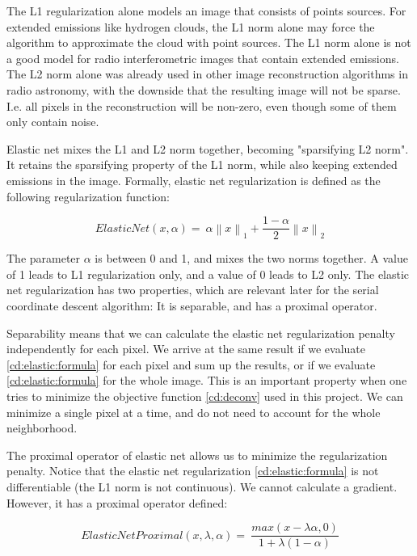 The L1 regularization alone models an image that consists of points sources. For extended emissions like hydrogen clouds, the L1 norm alone may force the algorithm to approximate the cloud with point sources. The L1 norm alone is not a good model for radio interferometric images that contain extended emissions. The L2 norm alone was already used in other image reconstruction algorithms in radio astronomy\cite{ferrari2014distributed}, with the downside that the resulting image will not be sparse. I.e. all pixels in the reconstruction will be non-zero, even though some of them only contain noise. 

Elastic net mixes the L1 and L2 norm together, becoming "sparsifying L2 norm". It retains the sparsifying property of the L1 norm, while also keeping extended emissions in the image. Formally, elastic net regularization is defined as the following regularization function:

\begin{equation}\label{cd:elastic:formula}
ElasticNet(x, \alpha) = \: \alpha \left \|x \right \|_1 + \frac{1-\alpha}{2}  \left \|x \right \|_2
\end{equation}

The parameter $\alpha$ is between 0 and 1, and mixes the two norms together. A value of 1 leads to L1 regularization only, and a value of 0 leads to L2 only. The elastic net regularization has two properties, which are relevant later for the serial coordinate descent algorithm: It is separable, and has a proximal operator.

Separability means that we can calculate the elastic net regularization penalty independently for each pixel. We arrive at the same result if we evaluate \eqref{cd:elastic:formula} for each pixel and sum up the results, or if we evaluate \eqref{cd:elastic:formula} for the whole image. This is an important property when one tries to minimize the objective function \eqref{cd:deconv} used in this project. We can minimize a single pixel at a time, and do not need to account for the whole neighborhood.

The proximal operator of elastic net allows us to minimize the regularization penalty. Notice that the elastic net regularization \eqref{cd:elastic:formula} is not differentiable (the L1 norm is not continuous). We cannot calculate a gradient. However, it has a proximal operator defined:

\begin{equation}\label{cd:elastic:proximal}
ElasticNetProximal(x, \lambda ,\alpha) = \: \frac{max(x - \lambda \alpha, 0)}{1+\lambda(1 - \alpha)}
\end{equation}

